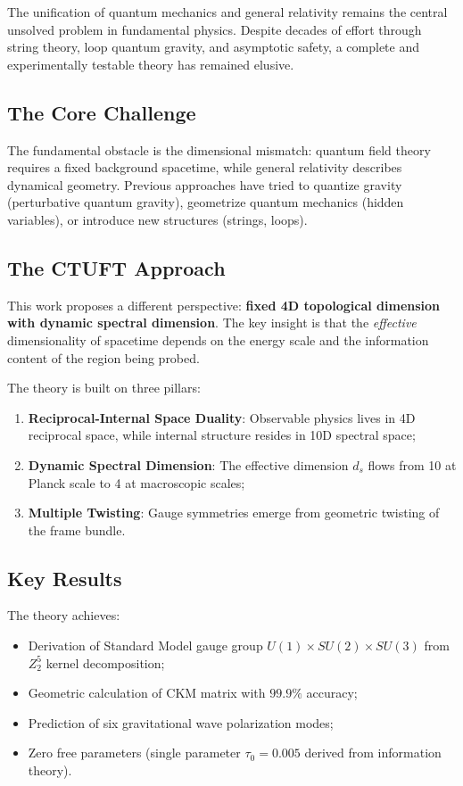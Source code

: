 \documentclass[aps,prd,reprint,superscriptaddress,amsmath,amssymb]{revtex4-2}
\begin{document}
The unification of quantum mechanics and general relativity remains the central unsolved problem in fundamental physics. Despite decades of effort through string theory, loop quantum gravity, and asymptotic safety, a complete and experimentally testable theory has remained elusive.

\subsection{The Core Challenge}

The fundamental obstacle is the dimensional mismatch: quantum field theory requires a fixed background spacetime, while general relativity describes dynamical geometry. Previous approaches have tried to quantize gravity (perturbative quantum gravity), geometrize quantum mechanics (hidden variables), or introduce new structures (strings, loops).

\subsection{The CTUFT Approach}

This work proposes a different perspective: \textbf{fixed 4D topological dimension with dynamic spectral dimension}. The key insight is that the \textit{effective} dimensionality of spacetime depends on the energy scale and the information content of the region being probed.

The theory is built on three pillars:
\begin{enumerate}
    \item \textbf{Reciprocal-Internal Space Duality}: Observable physics lives in 4D reciprocal space, while internal structure resides in 10D spectral space;
    \item \textbf{Dynamic Spectral Dimension}: The effective dimension $d_s$ flows from 10 at Planck scale to 4 at macroscopic scales;
    \item \textbf{Multiple Twisting}: Gauge symmetries emerge from geometric twisting of the frame bundle.
\end{enumerate}

\subsection{Key Results}

The theory achieves:
\begin{itemize}
    \item Derivation of Standard Model gauge group $U(1) \times SU(2) \times SU(3)$ from $Z_2^5$ kernel decomposition;
    \item Geometric calculation of CKM matrix with $99.9\%$ accuracy;
    \item Prediction of six gravitational wave polarization modes;
    \item Zero free parameters (single parameter $\tau_0 = 0.005$ derived from information theory).
\end{itemize}
\end{document}
